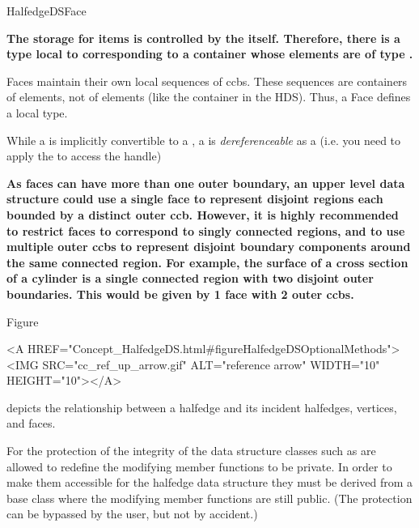 \begin{ccRefConcept}{HalfedgeDSFace}
\begin{ccAdvanced}
{\bf\ttfamily
The storage for  items is controlled by the  itself. Therefore, 
there is a  type local to  corresponding to a 
container whose elements are of type .

Faces maintain their own local sequences of ccbs. These sequences are
containers of  elements, not of  elements (like the
container in the HDS). Thus, a Face defines a local  type.

While a  is implicitly convertible to a ,
a  is {\em dereferenceable} as a  
(i.e. you need to apply the  to access the handle)
}
\end{ccAdvanced}

\begin{ccAdvanced}
{\bf\ttfamily
As faces can have more than one outer boundary, an upper level data structure could use a single
face to represent disjoint regions each bounded by a distinct outer ccb. However,
it is highly recommended to restrict faces to correspond to singly connected regions, and
to use multiple outer ccbs to represent disjoint boundary components around the same 
connected region. For example, the surface of a cross section of a cylinder is a single
connected region with two disjoint outer boundaries. This would be given by 1 face with
2 outer ccbs.
}
\end{ccAdvanced}

Figure~\begin{ccHtmlOnly}
  <A HREF="Concept_HalfedgeDS.html#figureHalfedgeDSOptionalMethods"><IMG 
  SRC="cc_ref_up_arrow.gif" ALT="reference arrow" WIDTH="10" HEIGHT="10"></A>
\end{ccHtmlOnly}
depicts the relationship between a halfedge and its incident
halfedges, vertices, and faces.

For the protection of the integrity of the data structure classes such as
 are allowed to redefine the modifying member 
functions to be private. In order to make them accessible for the 
halfedge data structure they must be derived from a base class 
where the modifying member functions are still public. (The protection
can be bypassed by the user, but not by accident.)


\end{ccRefConcept}
